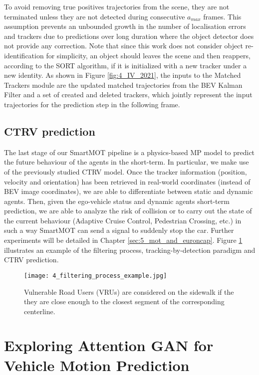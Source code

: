 To avoid removing true positives trajectories from the scene, they are not terminated unless they are not detected during consecutive $a_{max}$ frames. This assumption prevents an unbounded growth in the number of localisation errors and trackers due to predictions over long duration where the object detector does not provide any correction. Note that since this work does not consider object re-identification for simplicity, an object should leaves the scene and then reappers, according to the SORT algorithm, if it is initialized with a new tracker under a new identity. As shown in Figure \ref{fig:4_IV_2021}, the inputs to the Matched Trackers module are the updated matched trajectories from the BEV Kalman Filter and a set of created and deleted trackers, which jointly represent the input trajectories for the prediction step in the following frame.

\subsection{CTRV prediction}
\label{sec:4_smartmot_ctrv_prediction}

The last stage of our SmartMOT pipeline is a physics-based \ac{MP} model to predict the future behaviour of the agents in the short-term. In particular, we make use of the previously studied \ac{CTRV} model. Once the tracker information (position, velocity and orientation) has been retrieved in real-world coordinates (instead of \ac{BEV} image coordinates), we are able to differentiate between static and dynamic agents. Then, given the ego-vehicle status and dynamic agents short-term prediction, we are able to analyze the risk of collision or to carry out the state of the current behaviour (Adaptive Cruise Control, Pedestrian Crossing, etc.) in such a way SmartMOT can send a signal to suddenly stop the car. Further experiments will be detailed in Chapter \ref{sec:5_mot_and_euroncap}. Figure \ref{fig:4_filtering_process_example} illustrates an example of the filtering process, tracking-by-detection paradigm and \ac{CTRV} prediction.

\begin{figure}[] 
	\centering
	\texttt{[image: 4\_filtering\_process\_example.jpg]}
	\caption{Vulnerable Road Users (VRUs) are considered on the sidewalk if the they are close enough to the closest segment of the corresponding centerline.}
	\label{fig:4_filtering_process_example}
\end{figure} 

\section{Exploring Attention GAN for Vehicle Motion Prediction}
\label{sec:4_gan_lstm}

